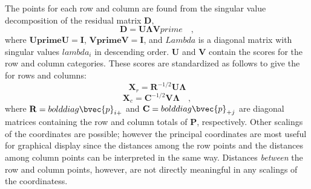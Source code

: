 The points for each row and column are found from the singular value
decomposition of the residual matrix \(\mathbf{D}\),
\begin{equation}\label{eq:casvd}
\mathbf{D} = \mathbf{U}  \mathbf{\Lambda}  \mathbf{V} prime
\quad ,
\end{equation}
where \(\mathbf{ U prime  U } = \mathbf{I}\),
\(\mathbf{ V prime  V } = \mathbf{I}\),
and \(Lambda\) is a diagonal matrix with singular values \(lambda_{i}\)
in descending order.
\(\mathbf{U}\) and \(\mathbf{V}\) contain the scores for the row and column categories.
These scores are standardized as follows to give
the  for rows and columns:
\begin{equation}\label{eq:caxr}
\mathbf{X}_{r} = \mathbf{R}^{- 1 / 2}  \mathbf{U}  \mathbf{\Lambda}
\end{equation}
\begin{equation}\label{eq:caxc}
\mathbf{X}_{c} = \mathbf{C}^{- 1 / 2}  \mathbf{V}  \mathbf{\Lambda}
\quad ,
\end{equation}
where \(\mathbf{R} = bold diag { \bvec{p}_{i+} }\)
and \(\mathbf{C} = bold diag { \bvec{p}_{+j} }\) are
diagonal matrices containing the row and column totals of \(\mathbf{P}\),
respectively.
Other scalings of the coordinates are possible; however
the principal coordinates are most useful for graphical
display since the distances among the row points and the
distances among column points can be interpreted in the same way.
Distances \emph{between} the row and column points, however,
are not directly meaningful in any scalings of the coordinatess.


